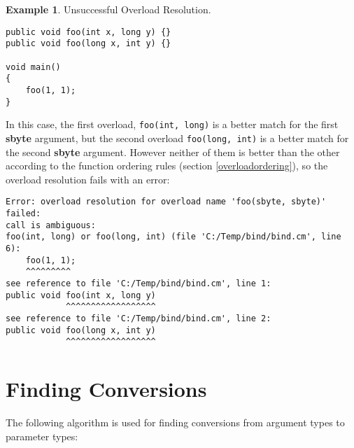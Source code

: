 \documentclass[a4paper,oneside,11pt]{book}
\theoremstyle{definition}
\newtheorem{exmp}{Example}[section]
\begin{document}
\begin{exmp} Unsuccessful Overload Resolution.
\lstset{language=Cmajor}
\begin{lstlisting}[frame=trBL]
public void foo(int x, long y) {}
public void foo(long x, int y) {}

void main()
{
    foo(1, 1);
}
\end{lstlisting}

In this case, the first overload, \verb|foo(int, long)| is a better match for the first \textbf{sbyte} argument,
but the second overload \verb|foo(long, int)| is a better match for the second \textbf{sbyte} argument.
However neither of them is better than the other according to the function ordering rules (section \ref{overloadordering}),
so the overload resolution fails with an error:
\begin{verbatim}
Error: overload resolution for overload name 'foo(sbyte, sbyte)' failed:
call is ambiguous:
foo(int, long) or foo(long, int) (file 'C:/Temp/bind/bind.cm', line 6):
    foo(1, 1);
    ^^^^^^^^^
see reference to file 'C:/Temp/bind/bind.cm', line 1:
public void foo(int x, long y)
            ^^^^^^^^^^^^^^^^^^
see reference to file 'C:/Temp/bind/bind.cm', line 2:
public void foo(long x, int y)
            ^^^^^^^^^^^^^^^^^^
\end{verbatim}
\end{exmp}

\section{Finding Conversions}\label{findconversions}

The following algorithm is used for finding conversions from argument types to parameter types:
\end{document}
